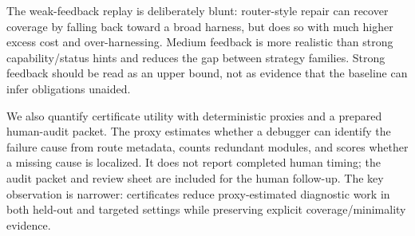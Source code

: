 \documentclass[
  10pt,
]{article}
\begin{document}
The weak-feedback replay is deliberately blunt: router-style repair can
recover coverage by falling back toward a broad harness, but does so
with much higher excess cost and over-harnessing. Medium feedback is
more realistic than strong capability/status hints and reduces the gap
between strategy families. Strong feedback should be read as an upper
bound, not as evidence that the baseline can infer obligations unaided.

We also quantify certificate utility with deterministic proxies and a
prepared human-audit packet. The proxy estimates whether a debugger can
identify the failure cause from route metadata, counts redundant
modules, and scores whether a missing cause is localized. It does not
report completed human timing; the audit packet and review sheet are
included for the human follow-up. The key observation is narrower:
certificates reduce proxy-estimated diagnostic work in both held-out and
targeted settings while preserving explicit coverage/minimality
evidence.

\begin{table}[H]
\centering
\tiny
\caption{Certificate utility proxy. This is a deterministic proxy plus an audit packet, not a completed human timing study.}
\label{tab:certificate-utility}
\end{table}
\end{document}
